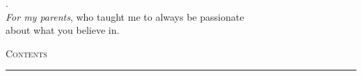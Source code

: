 \documentclass[11pt,letterpaper,openright,oneside]{report}
\makeatletter
\newcommand*{\toccontents}{\@starttoc{toc}} %
\makeatother
\begin{document}


\thispagestyle{empty}
\begin{center}
{\color{white} .}\\
\vspace{60mm}
\textit{For my parents}, who taught me to always be passionate \\
about what you believe in. 
\end{center}
\clearpage

\setcounter{page}{1}
\noindent \textsc{\Large Contents} \\
\hrule
\toccontents				%


\pagebreak
\pagestyle{fancy}
\renewcommand{\headrulewidth}{0pt}
\renewcommand{\sectionmark}[1]{\markright{#1}}
\lhead{\footnotesize \textsc{\thesection \hspace{2mm} \rightmark}}
\cfoot{}





\end{document}
